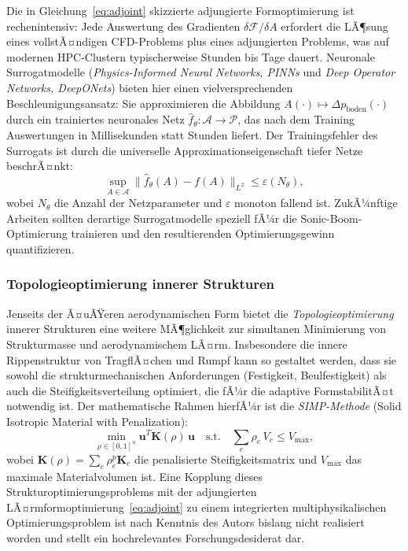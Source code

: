 ﻿\documentclass[12pt,a4paper]{article}
\theoremstyle{definition}
\theoremstyle{remark}
\begin{document}
Die in Gleichung~\eqref{eq:adjoint} skizzierte adjungierte Formoptimierung ist rechenintensiv:
Jede Auswertung des Gradienten $\delta\mathcal{F}/\delta A$ erfordert die LÃ¶sung eines
vollstÃ¤ndigen CFD-Problems plus eines adjungierten Problems, was auf modernen HPC-Clustern
typischerweise Stunden bis Tage dauert. Neuronale Surrogatmodelle (\emph{Physics-Informed
Neural Networks, PINNs} und \emph{Deep Operator Networks, DeepONets}) bieten hier einen
vielversprechenden Beschleunigungsansatz: Sie approximieren die Abbildung
$A(\cdot) \mapsto \Delta p_\text{boden}(\cdot)$ durch ein trainiertes neuronales Netz
$\hat{f}_\theta: \mathcal{A} \to \mathcal{P}$, das nach dem Training Auswertungen in
Millisekunden statt Stunden liefert. Der Trainingsfehler des Surrogats ist durch die
universelle Approximationseigenschaft tiefer Netze beschrÃ¤nkt:
\begin{equation}
  \sup_{A \in \mathcal{A}} \|\hat{f}_\theta(A) - f(A)\|_{L^2} \le \varepsilon(N_\theta),
  \label{eq:surrogat}
\end{equation}
wobei $N_\theta$ die Anzahl der Netzparameter und $\varepsilon$ monoton fallend ist.
ZukÃ¼nftige Arbeiten sollten derartige Surrogatmodelle speziell fÃ¼r die Sonic-Boom-Optimierung
trainieren und den resultierenden Optimierungsgewinn quantifizieren.

\subsubsection{Topologieoptimierung innerer Strukturen}

Jenseits der Ã¤uÃŸeren aerodynamischen Form bietet die \emph{Topologieoptimierung} innerer
Strukturen eine weitere MÃ¶glichkeit zur simultanen Minimierung von Strukturmasse und
aerodynamischem LÃ¤rm. Insbesondere die innere Rippenstruktur von TragflÃ¤chen und Rumpf
kann so gestaltet werden, dass sie sowohl die strukturmechanischen Anforderungen (Festigkeit,
Beulfestigkeit) als auch die Steifigkeitsverteilung optimiert, die fÃ¼r die adaptive
FormstabilitÃ¤t notwendig ist. Der mathematische Rahmen hierfÃ¼r ist die
\emph{SIMP-Methode} (Solid Isotropic Material with Penalization):
\begin{equation}
  \min_{\rho \in [0,1]^n} \mathbf{u}^T \mathbf{K}(\rho)\, \mathbf{u}
  \quad \text{s.t.} \quad \sum_e \rho_e \, V_e \le V_{\max},
  \label{eq:simp}
\end{equation}
wobei $\mathbf{K}(\rho) = \sum_e \rho_e^p \mathbf{K}_e$ die penalisierte Steifigkeitsmatrix
und $V_{\max}$ das maximale Materialvolumen ist. Eine Kopplung dieses Strukturoptimierungsproblems
mit der adjungierten LÃ¤rmformoptimierung~\eqref{eq:adjoint} zu einem integrierten multiphysikalischen
Optimierungsproblem ist nach Kenntnis des Autors bislang nicht realisiert worden und stellt
ein hochrelevantes Forschungsdesiderat dar.
\end{document}
